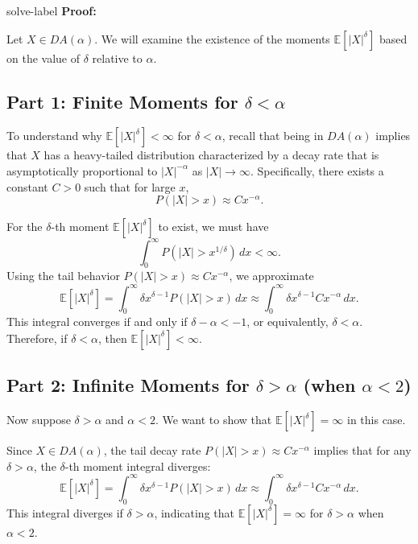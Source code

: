 	\begin{solve}{}{solve-label}
\textbf{Proof:}

Let \( X \in DA(\alpha) \). We will examine the existence of the moments \( \mathbb{E}[|X|^\delta] \) based on the value of \( \delta \) relative to \( \alpha \).

\subsection*{Part 1: Finite Moments for \( \delta < \alpha \)}

To understand why \( \mathbb{E}[|X|^\delta] < \infty \) for \( \delta < \alpha \), recall that being in \( DA(\alpha) \) implies that \( X \) has a heavy-tailed distribution characterized by a decay rate that is asymptotically proportional to \( |X|^{-\alpha} \) as \( |X| \to \infty \). Specifically, there exists a constant \( C > 0 \) such that for large \( x \),
\[
P(|X| > x) \approx C x^{-\alpha}.
\]

For the \( \delta \)-th moment \( \mathbb{E}[|X|^\delta] \) to exist, we must have
\[
\int_{0}^{\infty} P(|X| > x^{1/\delta}) \, dx < \infty.
\]
Using the tail behavior \( P(|X| > x) \approx C x^{-\alpha} \), we approximate
\[
\mathbb{E}[|X|^\delta] = \int_{0}^{\infty} \delta x^{\delta - 1} P(|X| > x) \, dx \approx \int_{0}^{\infty} \delta x^{\delta - 1} C x^{-\alpha} \, dx.
\]
This integral converges if and only if \( \delta - \alpha < -1 \), or equivalently, \( \delta < \alpha \). Therefore, if \( \delta < \alpha \), then \( \mathbb{E}[|X|^\delta] < \infty \).

\subsection*{Part 2: Infinite Moments for \( \delta > \alpha \) (when \( \alpha < 2 \))}

Now suppose \( \delta > \alpha \) and \( \alpha < 2 \). We want to show that \( \mathbb{E}[|X|^\delta] = \infty \) in this case.

Since \( X \in DA(\alpha) \), the tail decay rate \( P(|X| > x) \approx C x^{-\alpha} \) implies that for any \( \delta > \alpha \), the \( \delta \)-th moment integral diverges:
\[
\mathbb{E}[|X|^\delta] = \int_{0}^{\infty} \delta x^{\delta - 1} P(|X| > x) \, dx \approx \int_{0}^{\infty} \delta x^{\delta - 1} C x^{-\alpha} \, dx.
\]
This integral diverges if \( \delta > \alpha \), indicating that \( \mathbb{E}[|X|^\delta] = \infty \) for \( \delta > \alpha \) when \( \alpha < 2 \).


\end{solve}
